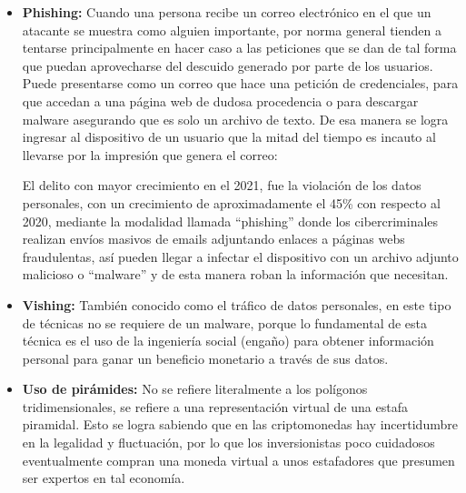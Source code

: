 
\begin{itemize}
  \item \textbf{Phishing:}
    Cuando una persona recibe un correo electrónico en el que un atacante se
    muestra como alguien importante, por norma general tienden a tentarse
    principalmente en hacer caso a las peticiones que se dan de tal forma que
    puedan aprovecharse del descuido generado por parte de los usuarios. Puede
    presentarse como un correo que hace una petición de credenciales, para que
    accedan a una página web de dudosa procedencia o para descargar malware
    asegurando que es solo un archivo de texto. De esa manera se logra ingresar al
    dispositivo de un usuario que la mitad del tiempo es incauto al llevarse por la
    impresión que genera el correo:

    \begin{displayquote}
      El delito con mayor crecimiento en el 2021, fue la violación de los datos
      personales, con un crecimiento de aproximadamente el 45\% con respecto al 2020,
      mediante la modalidad llamada ``phishing'' donde los cibercriminales realizan
      envíos masivos de emails adjuntando enlaces a páginas webs fraudulentas, así
      pueden llegar a infectar el dispositivo con un archivo adjunto malicioso o
      ``malware'' y de esta manera roban la información que necesitan.
      \parencite[INCIBE, 2010, como se cita en][]{Bueno2022}
    \end{displayquote}

  \item \textbf{Vishing:}
    También conocido como el tráfico de datos personales, en este tipo de
    técnicas no se requiere de un malware, porque lo fundamental de esta
    técnica es el uso de la ingeniería social (engaño) para obtener información
    personal para ganar un beneficio monetario a través de sus datos.
    \parencite{Mosquera2019}

  \item \textbf{Uso de pirámides:}
    No se refiere literalmente a los polígonos tridimensionales, se refiere a
    una representación virtual de una estafa piramidal. Esto se logra sabiendo
    que en las criptomonedas hay incertidumbre en la legalidad y fluctuación,
    por lo que los inversionistas poco cuidadosos eventualmente compran una
    moneda virtual a unos estafadores que presumen ser expertos en tal economía.
    \parencite{Mosquera2019}


\end{itemize}
